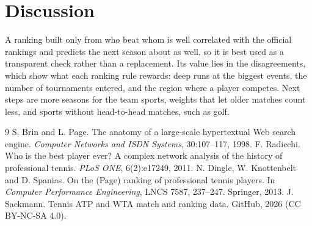\documentclass[10pt,twocolumn]{article}
\begin{document}
\section{Discussion}
A ranking built only from who beat whom is well correlated with the official rankings and predicts the next season about as well, so it is best used as a transparent check rather than a replacement. Its value lies in the disagreements, which show what each ranking rule rewards: deep runs at the biggest events, the number of tournaments entered, and the region where a player competes. Next steps are more seasons for the team sports, weights that let older matches count less, and sports without head-to-head matches, such as golf.

\small
\begin{thebibliography}{9}\setlength{\itemsep}{0pt}
 S. Brin and L. Page. The anatomy of a large-scale hypertextual Web search engine. \emph{Computer Networks and ISDN Systems}, 30:107--117, 1998.
 F. Radicchi. Who is the best player ever? A complex network analysis of the history of professional tennis. \emph{PLoS ONE}, 6(2):e17249, 2011.
 N. Dingle, W. Knottenbelt and D. Spanias. On the (Page) ranking of professional tennis players. In \emph{Computer Performance Engineering}, LNCS 7587, 237--247. Springer, 2013.
 J. Sackmann. Tennis ATP and WTA match and ranking data. GitHub, 2026 (CC BY-NC-SA 4.0).
\end{thebibliography}
\end{document}

